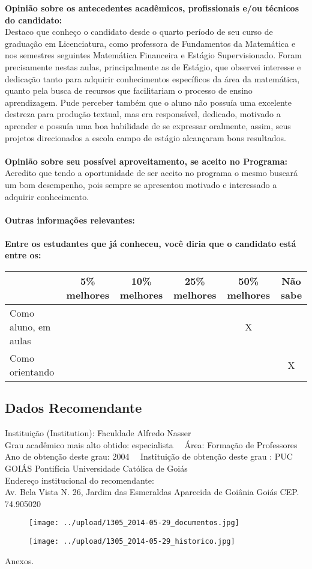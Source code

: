 \documentclass[11pt]{article}
\begin{document}
\textbf{Opinião sobre os antecedentes acadêmicos, profissionais e/ou técnicos do candidato:}
\\Destaco que conheço o candidato desde o quarto período de seu curso de graduação em Licenciatura, como professora de Fundamentos da Matemática e nos semestres seguintes Matemática Financeira e Estágio Supervisionado. Foram precisamente nestas aulas, principalmente as de Estágio, que observei interesse e dedicação tanto para adquirir conhecimentos específicos da área da matemática, quanto pela busca de recursos que facilitariam o processo de ensino aprendizagem.
	Pude perceber também que o aluno não possuía uma excelente destreza para produção textual, mas era responsável, dedicado, motivado a aprender e possuía uma boa habilidade de se expressar oralmente, assim, seus projetos direcionados a escola campo de estágio alcançaram bons resultados.\\
\\
\textbf{Opinião sobre seu possível aproveitamento, se aceito no Programa:}
\\Acredito que tendo a oportunidade de ser aceito no programa o mesmo buscará um bom desempenho, pois sempre se apresentou motivado e interessado a adquirir conhecimento.\\ 
\\
\textbf{Outras informações relevantes:} \\
\\[0.3cm]
\textbf{Entre os estudantes que já conheceu, você diria que o candidato está entre os:}
\\
\begin{tabular}{|l|c|c|c|c|c|}
\hline
 & 5\% melhores & 10\% melhores & 25\% melhores & 50\% melhores & Não sabe \\
\hline
Como aluno, em aulas &  &  &  & X & \\
\hline
Como orientando &  &  &  &  & X\\
\hline
\end{tabular}
\subsection*{Dados Recomendante} 
	Instituição (Institution): Faculdade Alfredo Nasser
\\ 
	Grau acadêmico mais alto obtido: especialista
	\ \ Área: Formação de Professores
	\\
	Ano de obtenção deste grau: 2004
	\ \ 
	Instituição de obtenção deste grau : PUC GOIÁS  Pontifícia Universidade Católica de Goiás
	\\ 
	Endereço institucional do recomendante: \\ Av. Bela Vista N. 26, Jardim das Esmeraldas
Aparecida de Goiânia  Goiás
CEP. 74.905020	
\begin{figure}[!htb]
\texttt{[image: ../upload/1305\_2014-05-29\_documentos.jpg]}
\end{figure}	
\begin{figure}[!htb]
\texttt{[image: ../upload/1305\_2014-05-29\_historico.jpg]}
\end{figure} 
\begin{center}
Anexos.
\end{center}
\end{document}
